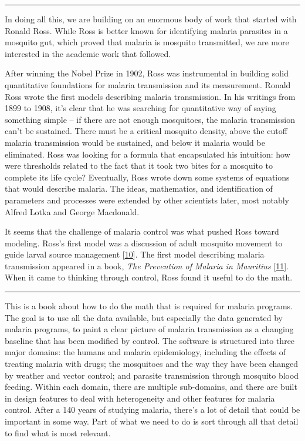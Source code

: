 \documentclass[
]{book}
\begin{document}
\begin{center}\rule{0.5\linewidth}{0.5pt}\end{center}

In doing all this, we are building on an enormous body of work that started with Ronald Ross. While Ross is better known for identifying malaria parasites in a mosquito gut, which proved that malaria is mosquito transmitted, we are more interested in the academic work that followed.

After winning the Nobel Prize in 1902, Ross was instrumental in building solid quantitative foundations for malaria transmission and its measurement. Ronald Ross wrote the first models describing malaria transmission. In his writings from 1899 to 1908, it's clear that he was searching for quantitative way of saying something simple -- if there are not enough mosquitoes, the malaria transmission can't be sustained. There must be a critical mosquito density, above the cutoff malaria transmission would be sustained, and below it malaria would be eliminated. Ross was looking for a formula that encapsulated his intuition: how were thresholds related to the fact that it took two bites for a mosquito to complete its life cycle? Eventually, Ross wrote down some systems of equations that would describe malaria. The ideas, mathematics, and identification of parameters and processes were extended by other scientists later, most notably Alfred Lotka and George Macdonald.

It seems that the challenge of malaria control was what pushed Ross toward modeling. Ross's first model was a discussion of adult mosquito movement to guide larval source management {[}\protect\hyperlink{ref-RossR1905LogicalBasis}{10}{]}. The first model describing malaria transmission appeared in a book, \emph{The Prevention of Malaria in Mauritius} {[}\protect\hyperlink{ref-RossR1908ReportPrevention}{11}{]}. When it came to thinking through control, Ross found it useful to do the math.

\begin{center}\rule{0.5\linewidth}{0.5pt}\end{center}

This is a book about how to do the math that is required for malaria programs. The goal is to use all the data available, but especially the data generated by malaria programs, to paint a clear picture of malaria transmission as a changing baseline that has been modified by control. The software is structured into three major domains: the humans and malaria epidemiology, including the effects of treating malaria with drugs; the mosquitoes and the way they have been changed by weather and vector control; and parasite transmission through mosquito blood feeding. Within each domain, there are multiple sub-domains, and there are built in design features to deal with heterogeneity and other features for malaria control. After a 140 years of studying malaria, there's a lot of detail that could be important in some way. Part of what we need to do is sort through all that detail to find what is most relevant.
\end{document}
